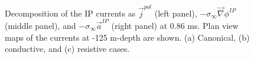 \documentclass[extra,mreferee]{gji}
\newcommand{\grad}{\vec \nabla}
\newcommand{\siginf}{\sigma_\infty}
\renewcommand {\j}  { {\vec j} }
\begin{document}
\begin{figure}
  \caption{Decomposition of the IP currents as $\j^{pol}$ (left panel), $-\siginf\grad \phi^{IP}$ (middle panel), and $-\siginf\vec{a}^{IP}$ (right panel) at 0.86 ms. Plan view maps of the currents at -125 m-depth are shown. (a) Canonical, (b) conductive, and (c) resistive cases. }
  \label{F:IPcurrents_helmholtz_early}
\end{figure}
\end{document}
